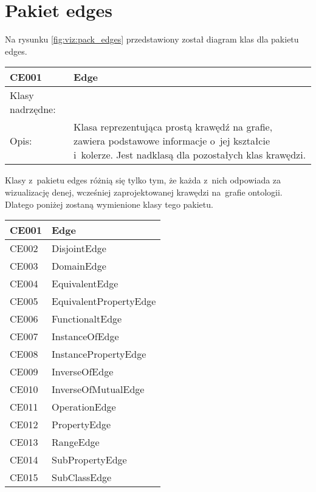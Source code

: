 \section{Pakiet edges}

Na rysunku  \figurename \space \ref{fig:viz:pack_edges}  przedstawiony został diagram klas dla pakietu edges.


\begin{longtable}{|m{3.5cm}|m{8.5cm}|} \hline

CE001 & Edge \\ \hline
Klasy nadrzędne: &     \\ \hline
Opis: & Klasa reprezentująca prostą krawędź na grafie, zawiera podstawowe informacje o~jej kształcie i~kolerze. 
Jest nadklasą dla pozostałych klas krawędzi.\\ \hline


\end{longtable}

Klasy z~pakietu edges różnią się tylko tym, że każda z~nich odpowiada za wizualizację denej, wcześniej zaprojektowanej krawędzi na~grafie ontologii.
Dlatego poniżej zostaną wymienione klasy tego pakietu.

\begin{longtable}{|m{4cm}|m{8cm}|} \hline
CE001  & Edge  \\ \hline
CE002  & DisjointEdge \\ \hline
CE003  & DomainEdge \\ \hline
CE004  & EquivalentEdge \\ \hline
CE005  & EquivalentPropertyEdge \\ \hline
CE006  & FunctionaltEdge \\ \hline
CE007  & InstanceOfEdge \\ \hline
CE008  & InstancePropertyEdge \\ \hline 
CE009  & InverseOfEdge \\ \hline
CE010  & InverseOfMutualEdge \\ \hline 
CE011  & OperationEdge \\ \hline 
CE012  & PropertyEdge \\ \hline
CE013  & RangeEdge \\ \hline
CE014  & SubPropertyEdge \\ \hline
CE015  & SubClassEdge \\ \hline


\end{longtable}

